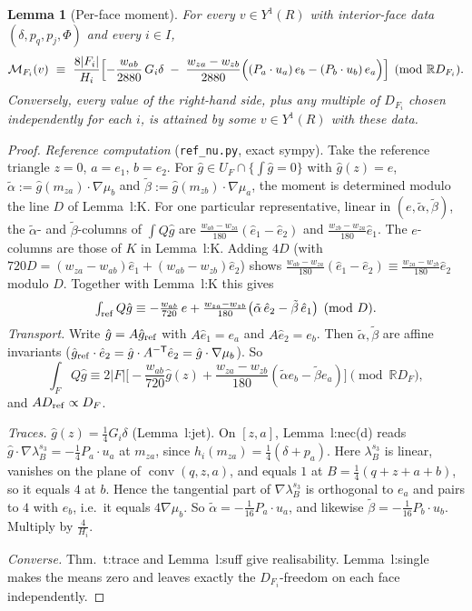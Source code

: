 \documentclass[11pt]{article}
\newtheorem{lemma}[theorem]{Lemma}
\theoremstyle{definition}
\newcommand{\R}{\mathbb R}
\newcommand{\M}{\mathcal M}
\newcommand{\gh}{\hat g}
\DeclareMathOperator{\conv}{conv}
\begin{document}
\begin{lemma}[Per-face moment]\label{l:face}
For every $v\in Y^1(R)$ with interior-face data $(\delta,p_q,p_j,\Phi)$ and every $i\in I$,
\[
\M_{F_i}(v)\ \equiv\ \frac{8|F_i|}{H_i}\Bigl[-\frac{w_{ab}}{2880}\,G_i\delta\;-\;\frac{w_{za}-w_{zb}}{2880}\Bigl((P_a\cdot u_a)\,e_b-(P_b\cdot u_b)\,e_a\Bigr)\Bigr]\pmod{\R D_{F_i}} .
\]
Conversely, every value of the right-hand side, plus any multiple of $D_{F_i}$ chosen independently for each $i$, is attained by some $v\in Y^1(R)$ with these data.
\end{lemma}
\begin{proof}
\emph{Reference computation} (\texttt{ref\_nu.py}, exact sympy). Take the reference triangle $z=0$, $a=e_1$, $b=e_2$. For $\gh\in U_F\cap\{\int\gh=0\}$ with $\gh(z)=e$, $\tilde\alpha:=\gh(m_{za})\cdot\nabla\mu_b$ and $\tilde\beta:=\gh(m_{zb})\cdot\nabla\mu_a$, the moment is determined modulo the line $D$ of Lemma~l:K. For one particular representative, linear in $(e,\tilde\alpha,\tilde\beta)$, the $\tilde\alpha$- and $\tilde\beta$-columns of $\int Q\gh$ are $\frac{w_{ab}-w_{za}}{180}(\hat e_1-\hat e_2)$ and $\frac{w_{zb}-w_{za}}{180}\hat e_1$. The $e$-columns are those of $K$ in Lemma~l:K. Adding $4D$ (with $720D=(w_{za}-w_{ab})\hat e_1+(w_{ab}-w_{zb})\hat e_2$) shows $\frac{w_{ab}-w_{za}}{180}(\hat e_1-\hat e_2)\equiv\frac{w_{za}-w_{zb}}{180}\hat e_2$ modulo $D$. Together with Lemma~l:K this gives
\[
\textstyle\int_{\rm ref}Q\gh\equiv-\frac{w_{ab}}{720}\,e+\frac{w_{za}-w_{zb}}{180}\bigl(\tilde\alpha\,\hat e_2-\tilde\beta\,\hat e_1\bigr)\pmod D .
\]
\emph{Transport.} Write $\gh=A\gh_{\rm ref}$ with $A\hat e_1=e_a$ and $A\hat e_2=e_b$. Then $\tilde\alpha,\tilde\beta$ are affine invariants ($\gh_{\rm ref}\cdot\hat e_2=\gh\cdot A^{-\mathsf T}\hat e_2=\gh\cdot\nabla\mu_b$). So
\[
\textstyle\int_FQ\gh\equiv2|F|\bigl[-\frac{w_{ab}}{720}\gh(z)+\frac{w_{za}-w_{zb}}{180}(\tilde\alpha e_b-\tilde\beta e_a)\bigr]\pmod{\R D_F},
\]
and $AD_{\rm ref}\propto D_F$.

\emph{Traces.} $\gh(z)=\frac14G_i\delta$ (Lemma~l:jet). On $[z,a]$, Lemma~l:nec(d) reads $\gh\cdot\nabla\lambda_B^{s_3}=-\frac14P_a\cdot u_a$ at $m_{za}$, since $h_i(m_{za})=\frac14(\delta+p_a)$. Here $\lambda_B^{s_3}$ is linear, vanishes on the plane of $\conv(q,z,a)$, and equals $1$ at $B=\frac14(q+z+a+b)$, so it equals $4$ at $b$. Hence the tangential part of $\nabla\lambda_B^{s_3}$ is orthogonal to $e_a$ and pairs to $4$ with $e_b$, i.e.\ it equals $4\nabla\mu_b$. So $\tilde\alpha=-\frac1{16}P_a\cdot u_a$, and likewise $\tilde\beta=-\frac1{16}P_b\cdot u_b$. Multiply by $\frac4{H_i}$.

\emph{Converse.} Thm.~t:trace and Lemma~l:suff give realisability. Lemma~l:single makes the means zero and leaves exactly the $D_{F_i}$-freedom on each face independently.
\end{proof}
\end{document}
